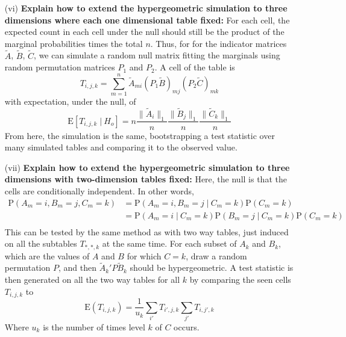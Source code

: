 \documentclass[11pt]{article}
\newcommand{\E}{\mathrm{E}}
\newcommand{\p}{\mathrm{P}}
\newcommand{\st}{ \; \big | \:}
\theoremstyle{definition}
\begin{document}
\begin{itemize}
\begin{itemize}
            \item[(vi)] {\bf Explain how to extend the hypergeometric simulation to three dimensions where each one dimensional table fixed:} 
                For each cell, the expected count in each cell under the null should still be the product of the marginal probabilities times the total $n$. Thus, for for the indicator matrices $\tilde A$, $\tilde B$, $\tilde C$, we can simulate a random null matrix fitting the marginals using random permutation matrices $P_1$ and $P_2$. A cell of the table is 
                \[ T_{i,j,k} = \sum_{m=1}^n \tilde A_{mi} (P_1\tilde B)_{mj} (P_2\tilde C)_{mk} \]
                with expectation, under the null, of
                \[ \E[T_{i,j,k}\st H_o] = n\frac{\|\tilde A_i\|_1}{n}\frac{\|\tilde B_j\|_1}{n}\frac{\|\tilde C_k\|_1}{n}\]
                From here, the simulation is the same, bootstrapping a test statistic over many simulated tables and comparing it to the observed value.
            \item[(vii)] {\bf Explain how to extend the hypergeometric simulation to three dimensions with two-dimension tables fixed:} 
                Here, the null is that the cells are conditionally independent. In other words,
                \begin{align*}
                    \p(A_m=i,B_m=j,C_m=k) &= \p(A_m=i,B_m=j\st C_m=k)\p( C_m=k) \\
                                          &= \p(A_m=i\st C_m=k)\p(B_m=j\st C_m=k)\p( C_m=k) \\
                \end{align*}
                This can be tested by the same method as with two way tables, just induced on all the subtables $T_{*,*,k}$ at the same time. For each subset of $A_k$ and $B_k$, which are the values of $A$ and $B$ for which $C=k$, draw a random permutation $P$, and then $\tilde A_k' P \tilde B_k$ should be hypergeometric. A test statistic is then generated on all the two way tables for all $k$ by comparing the seen cells $T_{i,j,k}$ to
                \[ \E(T_{i,j,k}) = \frac{1}{u_k}\sum_{i'} T_{i',j,k}\sum_{j'}T_{i,j',k} \]
                Where $u_k$ is the number of times level $k$ of $C$ occurs.
        \end{itemize}
\end{itemize}
\end{document}
